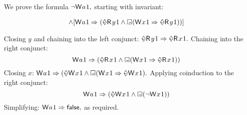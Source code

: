 \begin{example}
We prove the formula
\begin{math}
  \lnot\DW{a}{1},
\end{math}
starting with invariant:
\begin{scope}
\small
\begin{align*}
  [\once\DW{y}{1} \Rightarrow \once\DR{x}{1}]
  \land
  [\notonce\DW{a}{1} \Rightarrow (\once\DR{y}{1} \land \always(\DW{x}{1} \Rightarrow \once\DR{y}{1}))]
\end{align*}
\end{scope}
Closing $y$ and chaining into the left conjunct:
\begin{math}
  \once\DR{y}{1} \Rightarrow \once\DR{x}{1}.
\end{math}
Chaining into the right conjunct:
\begin{displaymath}
  \notonce\DW{a}{1} \Rightarrow (\once\DR{x}{1} \land \always(\DW{x}{1} \Rightarrow \once\DR{x}{1}))
\end{displaymath}
Closing $x$:
\begin{math}
  \notonce\DW{a}{1} \Rightarrow (\once\DW{x}{1} \land \always(\DW{x}{1} \Rightarrow \once\DW{x}{1}).
\end{math}
Applying coinduction to the right conjunct:
\begin{displaymath}
  \notonce\DW{a}{1} \Rightarrow (\once\DW{x}{1} \land \always(\lnot \DW{x}{1}))
\end{displaymath}
Simplifying:
\begin{math}
  \notonce\DW{a}{1} \Rightarrow \FALSE,
\end{math}
as required.
\end{example}

